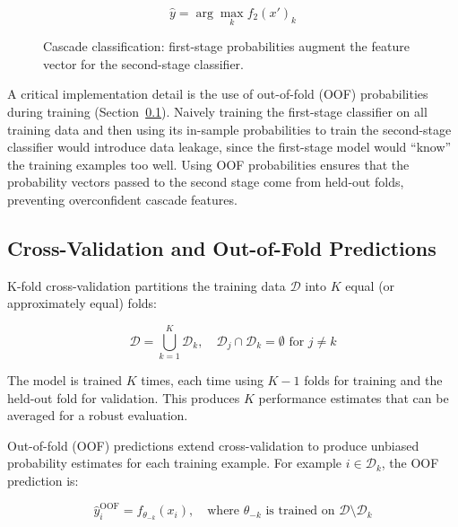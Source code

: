 \documentclass[10pt,a4paper]{article}
\begin{document}
\begin{equation}
\hat{y} = \arg\max_k f_2(x')_k
\label{eq:cascade-stage2}
\end{equation}

\begin{figure}[H]
    \centering
    \caption{Cascade classification: first-stage probabilities augment the feature vector for the second-stage classifier.}
    \label{fig:cascade-classifier}
\end{figure}

A critical implementation detail is the use of out-of-fold (OOF) probabilities during training (Section~\ref{sec:cross-validation}). Naively training the first-stage classifier on all training data and then using its in-sample probabilities to train the second-stage classifier would introduce data leakage, since the first-stage model would ``know'' the training examples too well. Using OOF probabilities ensures that the probability vectors passed to the second stage come from held-out folds, preventing overconfident cascade features.

\subsection{Cross-Validation and Out-of-Fold Predictions}
\label{sec:cross-validation}

K-fold cross-validation partitions the training data $\mathcal{D}$ into $K$ equal (or approximately equal) folds:

\begin{equation}
\mathcal{D} = \bigcup_{k=1}^{K} \mathcal{D}_k, \quad \mathcal{D}_j \cap \mathcal{D}_k = \emptyset \text{ for } j \neq k
\label{eq:kfold}
\end{equation}

The model is trained $K$ times, each time using $K-1$ folds for training and the held-out fold for validation. This produces $K$ performance estimates that can be averaged for a robust evaluation.

Out-of-fold (OOF) predictions extend cross-validation to produce unbiased probability estimates for each training example. For example $i \in \mathcal{D}_k$, the OOF prediction is:

\begin{equation}
\hat{y}_i^{\text{OOF}} = f_{\theta_{-k}}(x_i), \quad \text{where } \theta_{-k} \text{ is trained on } \mathcal{D} \setminus \mathcal{D}_k
\label{eq:oof}
\end{equation}
\end{document}
